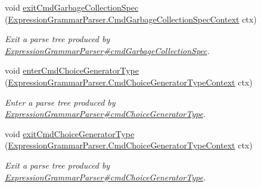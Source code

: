 \begin{DoxyCompactItemize}
void \hyperlink{interfacegov_1_1nasa_1_1jpf_1_1inspector_1_1server_1_1expression_1_1parser_1_1_expression_grammar_listener_ab14a1f46597c5a2206b1284e8acc8b6d}{exit\+Cmd\+Garbage\+Collection\+Spec} (\hyperlink{classgov_1_1nasa_1_1jpf_1_1inspector_1_1server_1_1expression_1_1parser_1_1_expression_grammar_pa9b16c5c3aaa9986dba28b01bf7446bf9}{Expression\+Grammar\+Parser.\+Cmd\+Garbage\+Collection\+Spec\+Context} ctx)
\begin{DoxyCompactList}\small\item\em Exit a parse tree produced by \hyperlink{classgov_1_1nasa_1_1jpf_1_1inspector_1_1server_1_1expression_1_1parser_1_1_expression_grammar_parser_a2218573ae0b280b9f81bd8a58b34932c}{Expression\+Grammar\+Parser\#cmd\+Garbage\+Collection\+Spec}. \end{DoxyCompactList}\item 
void \hyperlink{interfacegov_1_1nasa_1_1jpf_1_1inspector_1_1server_1_1expression_1_1parser_1_1_expression_grammar_listener_a039b922c85047818163b3c6cc074513d}{enter\+Cmd\+Choice\+Generator\+Type} (\hyperlink{classgov_1_1nasa_1_1jpf_1_1inspector_1_1server_1_1expression_1_1parser_1_1_expression_grammar_pa25195f4046c6a14884faf2c870f5b76d}{Expression\+Grammar\+Parser.\+Cmd\+Choice\+Generator\+Type\+Context} ctx)
\begin{DoxyCompactList}\small\item\em Enter a parse tree produced by \hyperlink{classgov_1_1nasa_1_1jpf_1_1inspector_1_1server_1_1expression_1_1parser_1_1_expression_grammar_parser_aa13af7ba7969feaa3eafc1383a1f42a1}{Expression\+Grammar\+Parser\#cmd\+Choice\+Generator\+Type}. \end{DoxyCompactList}\item 
void \hyperlink{interfacegov_1_1nasa_1_1jpf_1_1inspector_1_1server_1_1expression_1_1parser_1_1_expression_grammar_listener_a398121586b3e04e1147c469494f8fe09}{exit\+Cmd\+Choice\+Generator\+Type} (\hyperlink{classgov_1_1nasa_1_1jpf_1_1inspector_1_1server_1_1expression_1_1parser_1_1_expression_grammar_pa25195f4046c6a14884faf2c870f5b76d}{Expression\+Grammar\+Parser.\+Cmd\+Choice\+Generator\+Type\+Context} ctx)
\begin{DoxyCompactList}\small\item\em Exit a parse tree produced by \hyperlink{classgov_1_1nasa_1_1jpf_1_1inspector_1_1server_1_1expression_1_1parser_1_1_expression_grammar_parser_aa13af7ba7969feaa3eafc1383a1f42a1}{Expression\+Grammar\+Parser\#cmd\+Choice\+Generator\+Type}. \end{DoxyCompactList}\item 

\end{DoxyCompactItemize}
